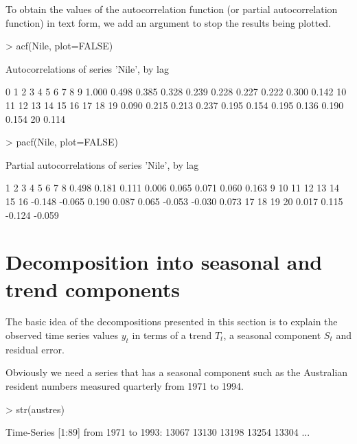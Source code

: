 To obtain the values of the autocorrelation function (or partial autocorrelation function) in text form, we add an argument to stop the results being plotted. 
\begin{Schunk}
\begin{Sinput}
> acf(Nile, plot=FALSE) 
\end{Sinput}
\begin{Soutput}

Autocorrelations of series 'Nile', by lag

    0     1     2     3     4     5     6     7     8     9 
1.000 0.498 0.385 0.328 0.239 0.228 0.227 0.222 0.300 0.142 
   10    11    12    13    14    15    16    17    18    19 
0.090 0.215 0.213 0.237 0.195 0.154 0.195 0.136 0.190 0.154 
   20 
0.114 
\end{Soutput}
\begin{Sinput}
> pacf(Nile, plot=FALSE) 
\end{Sinput}
\begin{Soutput}

Partial autocorrelations of series 'Nile', by lag

     1      2      3      4      5      6      7      8 
 0.498  0.181  0.111  0.006  0.065  0.071  0.060  0.163 
     9     10     11     12     13     14     15     16 
-0.148 -0.065  0.190  0.087  0.065 -0.053 -0.030  0.073 
    17     18     19     20 
 0.017  0.115 -0.124 -0.059 
\end{Soutput}
\end{Schunk}
 
\section{Decomposition into seasonal and trend components} 
 
The basic idea of the decompositions presented in this section is to explain the observed time series values $y_t$ in terms of a trend $T_t$, a seasonal component $S_t$ and residual error. 
 
Obviously we need a series that has a seasonal component such as the Australian resident numbers measured quarterly from  1971 to 1994. 
\begin{Schunk}
\begin{Sinput}
> str(austres) 
\end{Sinput}
\begin{Soutput}
 Time-Series [1:89] from 1971 to 1993: 13067 13130 13198 13254 13304 ...
\end{Soutput}
\end{Schunk}
 
